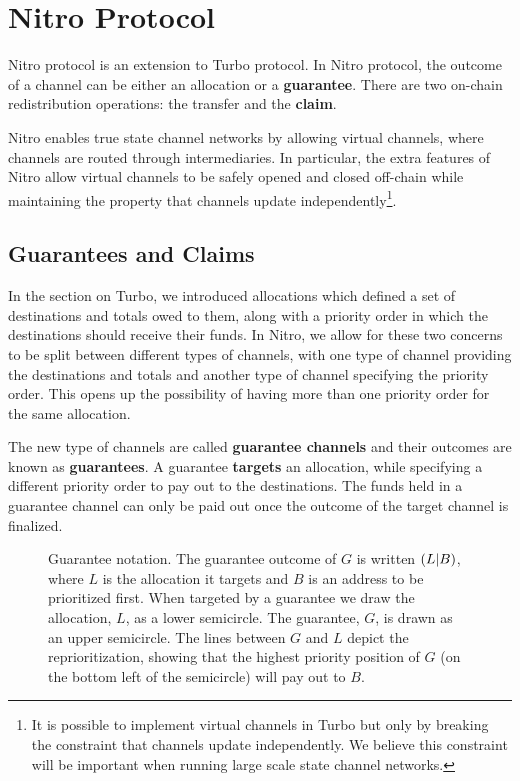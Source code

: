 \section{Nitro Protocol}

Nitro protocol is an extension to Turbo protocol.
In Nitro protocol, the outcome of a channel can be either an allocation or a \textbf{guarantee}.
There are two on-chain redistribution operations: the transfer and the \textbf{claim}.

Nitro enables true state channel networks by allowing virtual channels, where channels are routed through intermediaries.
In particular, the extra features of Nitro allow virtual channels to be safely opened and closed off-chain while maintaining the property that channels update independently\footnote{It is possible to implement virtual channels in Turbo but only by breaking the constraint that channels update independently. We believe this constraint will be important when running large scale state channel networks.}.

\subsection{Guarantees and Claims}

In the section on Turbo, we introduced allocations which defined a set of destinations and totals owed to them, along with a priority order in which the destinations should receive their funds.
In Nitro, we allow for these two concerns to be split between different types of channels, with
one type of channel providing the destinations and totals and another type of channel specifying the priority order.
This opens up the possibility of having more than one priority order for the same allocation.

The new type of channels are called \textbf{guarantee channels} and their outcomes are known as \textbf{guarantees}.
A guarantee \textbf{targets} an allocation, while specifying a different priority order to pay out to the destinations.
The funds held in a guarantee channel can only be paid out once the outcome of the target channel is finalized.

\begin{figure}[ht]\centering
  \makebox[\textwidth][c]{}
  \caption{
    Guarantee notation.
    The guarantee outcome of $G$ is written $( L | B )$, where $L$ is the allocation it targets and $B$ is an address to be prioritized first.
    When targeted by a guarantee we draw the allocation, $L$, as a lower semicircle.
    The guarantee, $G$, is drawn as an upper semicircle. 
    The lines between $G$ and $L$ depict the reprioritization, showing that the highest priority position of $G$ (on the bottom left of the semicircle) will pay out to $B$.
  }
  \label{fig:guarantee-notation}
\end{figure}


